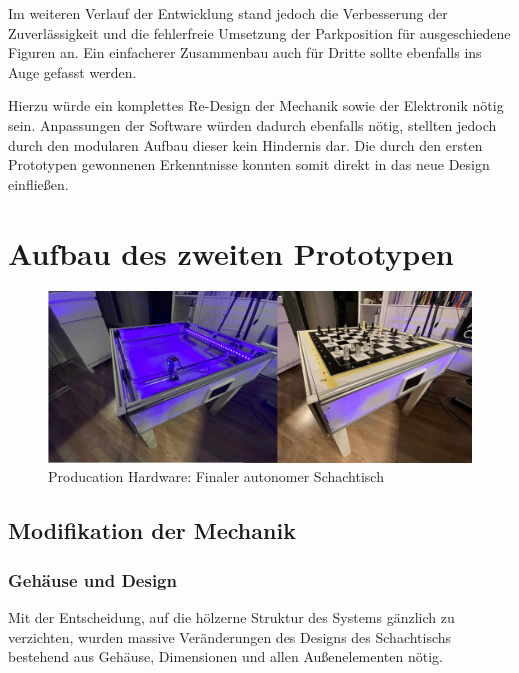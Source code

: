 Im weiteren Verlauf der Entwicklung stand jedoch die Verbesserung der
Zuverlässigkeit und die fehlerfreie Umsetzung der Parkposition für
ausgeschiedene Figuren an. Ein einfacherer Zusammenbau auch für Dritte
sollte ebenfalls ins Auge gefasst werden.

Hierzu würde ein komplettes Re-Design der Mechanik sowie der Elektronik
nötig sein. Anpassungen der Software würden dadurch ebenfalls nötig,
stellten jedoch durch den modularen Aufbau dieser kein Hindernis dar.
Die durch den ersten Prototypen gewonnenen Erkenntnisse konnten somit
direkt in das neue Design einfließen.

\hypertarget{aufbau-des-zweiten-prototypen}{%
\chapter{Aufbau des zweiten
Prototypen}\label{aufbau-des-zweiten-prototypen}}

\begin{figure}
\centering
\includegraphics{images/table_images/prod.png}
\caption{Producation Hardware: Finaler autonomer Schachtisch
\label{prod}}
\end{figure}

\hypertarget{modifikation-der-mechanik}{%
\section{Modifikation der Mechanik}\label{modifikation-der-mechanik}}

\hypertarget{gehuxe4use-und-design}{%
\subsection{Gehäuse und Design}\label{gehuxe4use-und-design}}

Mit der Entscheidung, auf die hölzerne Struktur des Systems gänzlich zu
verzichten, wurden massive Veränderungen des Designs des Schachtischs
bestehend aus Gehäuse, Dimensionen und allen Außenelementen nötig.

